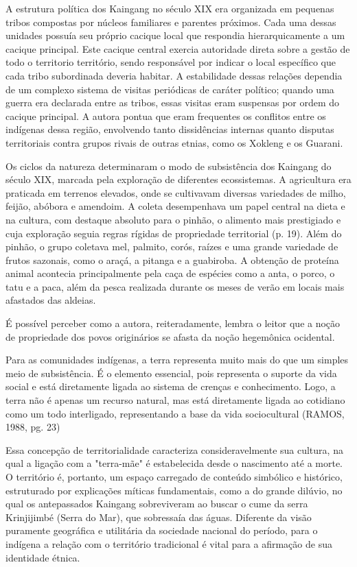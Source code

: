 \documentclass[12pt, a4paper]{article}
\newenvironment{citacao}{
  \vspace{0.5cm} %
  \small %
  \begin{list}{}{
    \leftmargin=4cm %
    \rightmargin=0cm
    \parsep=0pt
    \topsep=0pt
    \partopsep=0pt
  }
  \item\relax
  \linespread{1.0}\selectfont %
}{
  \end{list}
  \vspace{0.5cm} %
}
\begin{document}
A estrutura política dos Kaingang no século XIX era organizada em pequenas tribos compostas por núcleos familiares e parentes próximos. Cada uma dessas unidades possuía seu próprio cacique local que respondia hierarquicamente a um cacique principal. Este cacique central exercia autoridade direta sobre a gestão de todo o territorio território, sendo responsável por indicar o local específico que cada tribo subordinada deveria habitar. A estabilidade dessas relações dependia de um complexo sistema de visitas periódicas de caráter político; quando uma guerra era declarada entre as tribos, essas visitas eram suspensas por ordem do cacique principal. A autora pontua que eram frequentes os conflitos entre os indígenas dessa região, envolvendo tanto dissidências internas quanto disputas territoriais contra grupos rivais de outras etnias, como os Xokleng e os Guarani.

Os ciclos da natureza determinaram o modo de subsistência dos Kaingang do século XIX, marcada pela exploração de diferentes ecossistemas. A agricultura era praticada em terrenos elevados, onde se cultivavam diversas variedades de milho, feijão, abóbora e amendoim. A coleta desempenhava um papel central na dieta e na cultura, com destaque absoluto para o pinhão, o alimento mais prestigiado e cuja exploração seguia regras rígidas de propriedade territorial (p. 19). Além do pinhão, o grupo coletava mel, palmito, corós, raízes e uma grande variedade de frutos sazonais, como o araçá, a pitanga e a guabiroba. A obtenção de proteína animal acontecia principalmente pela caça de espécies como a anta, o porco, o tatu e a paca, além da pesca realizada durante os meses de verão em locais mais afastados das aldeias.

É possível perceber como a autora, reiteradamente, lembra o leitor que a noção de propriedade dos povos originários se afasta da noção hegemônica ocidental.
\begin{citacao}
	Para as comunidades indígenas, a terra representa muito mais do que um  simples meio de subsistência. É o elemento essencial, pois representa o suporte da  vida social e está diretamente ligada ao sistema de crenças e conhecimento. Logo, a  terra não é apenas um recurso natural, mas está diretamente ligada ao cotidiano  como um todo interligado, representando a base da vida sociocultural (RAMOS, 1988, pg. 23)
\end{citacao}
Essa concepção de territorialidade caracteriza consideravelmente sua cultura, na qual a ligação com a "terra-mãe" é estabelecida desde o nascimento até a morte. O território é, portanto, um espaço carregado de conteúdo simbólico e histórico, estruturado por explicações míticas fundamentais, como a do grande dilúvio, no qual os antepassados Kaingang sobreviveram ao buscar o cume da serra Krinjijimbé (Serra do Mar), que sobressaía das águas. Diferente da visão puramente geográfica e utilitária da sociedade nacional do período, para o indígena a relação com o território tradicional é vital para a afirmação de sua identidade étnica.
\end{document}
